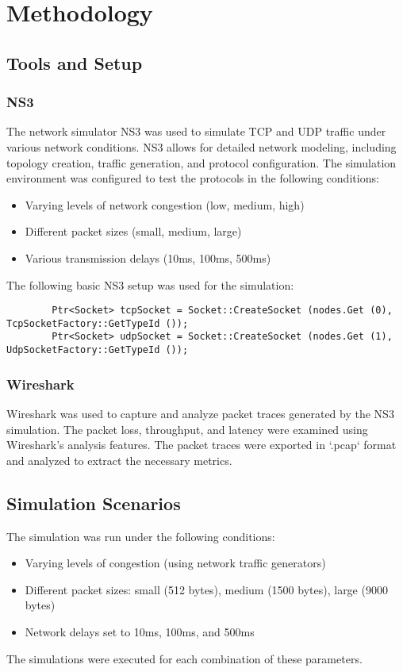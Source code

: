 \documentclass[a4paper,12pt]{article}
\begin{document}
	\section{Methodology}
	\subsection{Tools and Setup}
	\subsubsection{NS3}
	The network simulator NS3 was used to simulate TCP and UDP traffic under various network conditions. NS3 allows for detailed network modeling, including topology creation, traffic generation, and protocol configuration. The simulation environment was configured to test the protocols in the following conditions:
	\begin{itemize}
		\item Varying levels of network congestion (low, medium, high)
		\item Different packet sizes (small, medium, large)
		\item Various transmission delays (10ms, 100ms, 500ms)
	\end{itemize}
	The following basic NS3 setup was used for the simulation:
	\begin{verbatim}
		Ptr<Socket> tcpSocket = Socket::CreateSocket (nodes.Get (0), TcpSocketFactory::GetTypeId ());
		Ptr<Socket> udpSocket = Socket::CreateSocket (nodes.Get (1), UdpSocketFactory::GetTypeId ());
	\end{verbatim}
	
	\subsubsection{Wireshark}
	Wireshark was used to capture and analyze packet traces generated by the NS3 simulation. The packet loss, throughput, and latency were examined using Wireshark's analysis features. The packet traces were exported in `.pcap` format and analyzed to extract the necessary metrics.
	
	\subsection{Simulation Scenarios}
	The simulation was run under the following conditions:
	\begin{itemize}
		\item Varying levels of congestion (using network traffic generators)
		\item Different packet sizes: small (512 bytes), medium (1500 bytes), large (9000 bytes)
		\item Network delays set to 10ms, 100ms, and 500ms
	\end{itemize}
	The simulations were executed for each combination of these parameters.
	
\end{document}
